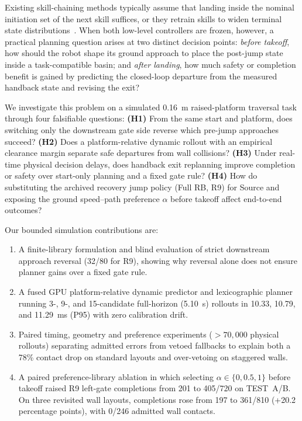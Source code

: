 \documentclass[letterpaper,10pt,conference]{ieeeconf}
\begin{document}
Existing skill-chaining methods typically assume that landing inside the nominal initiation set of the next skill suffices, or they retrain skills to widen terminal state distributions~\cite{chain}. When both low-level controllers are frozen, however, a practical planning question arises at two distinct decision points: \emph{before takeoff}, how should the robot shape its ground approach to place the post-jump state inside a task-compatible basin; and \emph{after landing}, how much safety or completion benefit is gained by predicting the closed-loop departure from the measured handback state and revising the exit?

We investigate this problem on a simulated 0.16~m raised-platform traversal task through four falsifiable questions: \textbf{(H1)} From the same start and platform, does switching only the downstream gate side reverse which pre-jump approaches succeed? \textbf{(H2)} Does a platform-relative dynamic rollout with an empirical clearance margin separate safe departures from wall collisions? \textbf{(H3)} Under real-time physical decision delays, does handback exit replanning improve completion or safety over start-only planning and a fixed gate rule? \textbf{(H4)} How do substituting the archived recovery jump policy (Full RB, R9) for Source and exposing the ground speed--path preference $\alpha$ before takeoff affect end-to-end outcomes?

Our bounded simulation contributions are:
\begin{enumerate}
\item A finite-library formulation and blind evaluation of strict downstream approach reversal (32/80 for R9), showing why reversal alone does not ensure planner gains over a fixed gate rule.
\item A fused GPU platform-relative dynamic predictor and lexicographic planner running 3-, 9-, and 15-candidate full-horizon (5.10~s) rollouts in 10.33, 10.79, and 11.29~ms (P95) with zero calibration drift.
\item Paired timing, geometry and preference experiments ($>70{,}000$ physical rollouts) separating admitted errors from vetoed fallbacks to explain both a 78\% contact drop on standard layouts and over-vetoing on staggered walls.
\item A paired preference-library ablation in which selecting $\alpha\in\{0,0.5,1\}$ before takeoff raised R9 left-gate completions from 201 to 405/720 on TEST~A/B. On three revisited wall layouts, completions rose from 197 to 361/810 (+20.2 percentage points), with 0/246 admitted wall contacts.
\end{enumerate}
\end{document}
